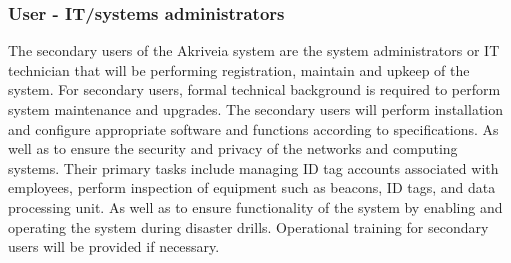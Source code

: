 \subsubsection{User - IT/systems administrators}
\medskip
The secondary users of the Akriveia system are the system administrators or IT technician that will be 
performing registration, maintain and upkeep of the system. For secondary users, formal technical background is required to perform system maintenance and upgrades. The secondary users will perform installation and configure appropriate software and functions according to specifications. As well as to ensure the security and privacy of the networks and computing systems. Their primary tasks include managing ID tag accounts associated with employees, perform inspection of equipment such as beacons, ID tags, and data processing unit. As well as to ensure functionality of the system by enabling and operating the system during disaster drills. Operational training for secondary users will be provided if necessary.







